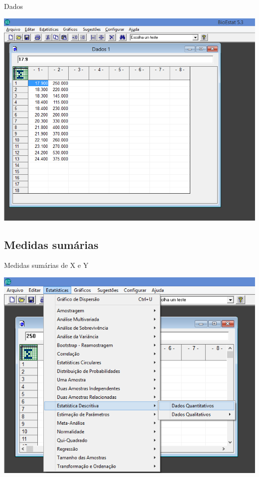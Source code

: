 \documentclass{beamer}
\begin{document}
\begin{frame}{Dados}
  \begin{center}
    \includegraphics[height=0.9\textheight]{Pratica_Desc/dados}
  \end{center}
\end{frame}

\subsection{Medidas sumárias}

\begin{frame}{Medidas sumárias de X e Y}
  \begin{center}
    \includegraphics[height=0.9\textheight]{Pratica_Desc/selecao_descritiva}
  \end{center}
\end{frame}
\end{document}
